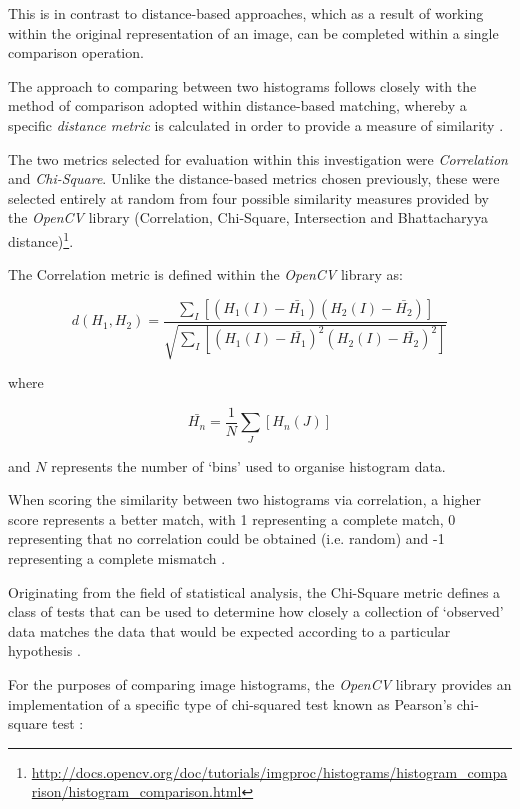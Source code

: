 This is in contrast to distance-based approaches, which as a result of working within the original representation of an image, can be completed within a single comparison operation. 

The approach to comparing between two histograms follows closely with the method of comparison adopted within distance-based matching, whereby a specific \textit{distance metric} is calculated in order to provide a measure of similarity \cite{bradski2008learning}. 

The two metrics selected for evaluation within this investigation were \textit{Correlation} and \textit{Chi-Square}. Unlike the distance-based metrics chosen previously, these were selected entirely at random from four possible similarity measures provided by the \textit{OpenCV} library (Correlation, Chi-Square, Intersection and Bhattacharyya distance)\footnote{\url{http://docs.opencv.org/doc/tutorials/imgproc/histograms/histogram_comparison/histogram_comparison.html}}.

The Correlation metric is defined within the \textit{OpenCV} library as:

\begin{equation}
d(H_{1}, H_{2}) = \frac{\sum\nolimits_{I}[(H_{1}(I) - \bar{H_{1}})(H_{2}(I) - \bar{H_{2}})]}{\sqrt{\sum\nolimits_{I}[(H_{1}(I) - \bar{H_{1}})^2(H_{2}(I) - \bar{H_{2}})^2]}}
\end{equation}

where

\begin{equation}
\bar{H_{n}} = \frac{1}{N}\sum\limits_{J}[H_{n}(J)]
\end{equation}

and $N$ represents the number of `bins' used to organise histogram data. 

When scoring the similarity between two histograms via correlation, a higher score represents a better match, with 1 representing a complete match, 0 representing that no correlation could be obtained (i.e. random) and -1 representing a complete mismatch \cite{bradski2008learning}.

Originating from the field of statistical analysis, the Chi-Square metric defines a class of tests that can be used to determine how closely a collection of `observed' data matches the data that would be expected according to a particular hypothesis \cite{mclaughlin}. 

For the purposes of comparing image histograms, the \textit{OpenCV} library provides an implementation of a specific type of chi-squared test known as Pearson's chi-square test \cite{bradski2008learning}:

